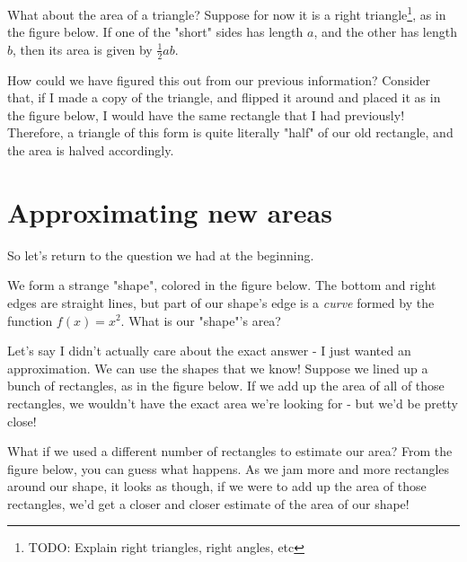 \documentclass{article}
\begin{document}


What about the area of a triangle? Suppose for now it is a right triangle\footnote{TODO: Explain right triangles, right angles, etc}, as in the figure below. If one of the "short" sides has length $a$, and the other has length $b$, then its area is given by $\frac{1}{2}ab$. 


How could we have figured this out from our previous information? Consider that, if I made a copy of the triangle, and flipped it around and placed it as in the figure below,  I would have the same rectangle that I had previously! Therefore, a triangle of this form is quite literally "half" of our old rectangle, and the area is halved accordingly.



\section{Approximating new areas}

So let's return to the question we had at the beginning.

We form a strange "shape", colored in the figure below. The bottom and right edges are straight lines, but part of our shape's edge is a \textit{curve} formed by the function $f(x) = x^2$. What is our "shape"'s area?



Let's say I didn't actually care about the exact answer - I just wanted an approximation. We can use the shapes that we know! Suppose we lined up a bunch of rectangles, as in the figure below. If we add up the area of all of those rectangles, we wouldn't have the exact area we're looking for - but we'd be pretty close!



What if we used a different number of rectangles to estimate our area? From the figure below, you can guess what happens. As we jam more and more rectangles around our shape, it looks as though, if we were to add up the area of those rectangles, we'd get a closer and closer estimate of the area of our shape!
\end{document}

